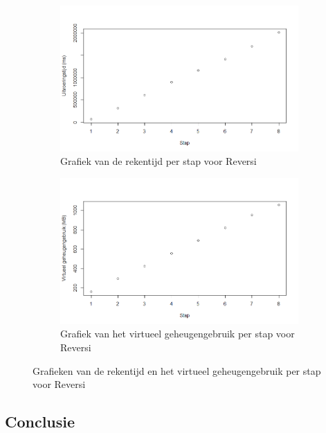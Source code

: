 \begin{figure}
	\centering
	\begin{subfigure}{\textwidth}
		\centering
		\includegraphics[width=\textwidth]{chap-evaluatie/reversi-time.png}
		\caption{Grafiek van de rekentijd per stap voor Reversi}
		\label{fig:reversi-time}
	\end{subfigure}
	\begin{subfigure}{\textwidth}
		\centering
		\includegraphics[width=\textwidth]{chap-evaluatie/reversi-space.png}
		\caption{Grafiek van het virtueel geheugengebruik per stap voor Reversi}
		\label{fig:reversi-space}
	\end{subfigure}
	\caption{Grafieken van de rekentijd en het virtueel geheugengebruik per stap voor Reversi}
	\label{fig:reversi-time-space}
\end{figure}

\subsection{Conclusie}

